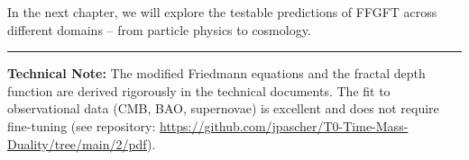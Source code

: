 In the next chapter, we will explore the testable predictions of FFGFT across different domains -- from particle physics to cosmology.

\vspace{1cm}
\hrule
\vspace{0.5cm}
\noindent\textbf{Technical Note:} The modified Friedmann equations and the fractal depth function are derived rigorously in the technical documents. The fit to observational data (CMB, BAO, supernovae) is excellent and does not require fine-tuning (see repository: \url{https://github.com/jpascher/T0-Time-Mass-Duality/tree/main/2/pdf}).



